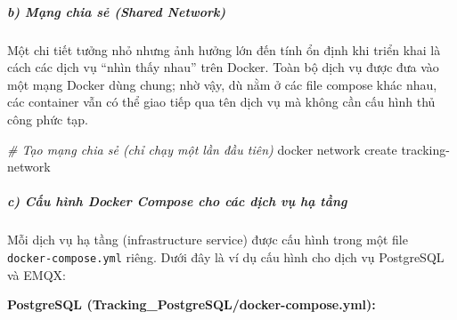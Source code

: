 \documentclass[a4paper]{extarticle}
\newenvironment{Shaded}{}{}
\newcommand{\CommentTok}[1]{\textcolor[rgb]{0.38,0.63,0.69}{\textit{#1}}}
\newcommand{\ExtensionTok}[1]{#1}
\newcommand{\NormalTok}[1]{#1}
\begin{document}
\subparagraph{b) Mạng chia sẻ (Shared
Network)}\label{b-mux1ea1ng-chia-sux1ebb-shared-network}

Một chi tiết tưởng nhỏ nhưng ảnh hưởng lớn đến tính ổn định khi triển
khai là cách các dịch vụ ``nhìn thấy nhau'' trên Docker. Toàn bộ dịch vụ
được đưa vào một mạng Docker dùng chung; nhờ vậy, dù nằm
ở các file compose khác nhau, các container vẫn có thể giao tiếp qua tên
dịch vụ mà không cần cấu hình thủ công phức tạp.

\begin{Shaded}
\begin{Highlighting}[]
\CommentTok{\# Tạo mạng chia sẻ (chỉ chạy một lần đầu tiên)}
\ExtensionTok{docker}\NormalTok{ network create tracking{-}network}
\end{Highlighting}
\end{Shaded}

\subparagraph{c) Cấu hình Docker Compose cho các dịch vụ hạ
tầng}\label{c-cux1ea5u-huxecnh-docker-compose-cho-cuxe1c-dux1ecbch-vux1ee5-hux1ea1-tux1ea7ng}

Mỗi dịch vụ hạ tầng (infrastructure service) được cấu hình trong một
file \texttt{docker-compose.yml} riêng. Dưới đây là ví dụ cấu hình cho
dịch vụ PostgreSQL và EMQX:

\textbf{PostgreSQL (Tracking\_PostgreSQL/docker-compose.yml):}
\end{document}
